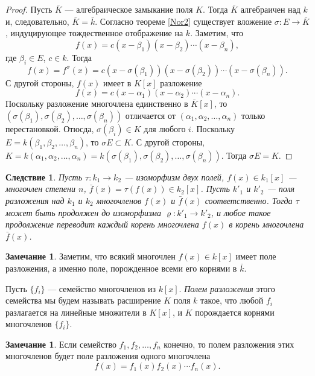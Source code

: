 \documentclass[12pt, titlepage, oneside]{amsbook}
\newtheorem{corollary}[theorem]{Следствие}
\theoremstyle{definition}
\newtheorem{remark}[theorem]{Замечание}
\theoremstyle{remark}
\begin{document}
\begin{proof}
Пусть $\bar{K}$ --- алгебраическое замыкание поля $K$. Тогда $\bar{K}$ алгебраичен над $k$ и, следовательно, $\bar{K}=\bar{k}$. Согласно теореме \ref{Nor2} существует вложение $\sigma\colon E\rightarrow\bar{K}$, индуцирующее тождественное отображение на $k$. Заметим, что $$f(x)=c(x-\beta_1)(x-\beta_2)\cdots (x-\beta_n),$$ где $\beta_i\in E$, $c\in k$. Тогда $$f(x)=f^{\sigma}(x)=c(x-\sigma(\beta_1))(x-\sigma(\beta_2))\cdots (x-\sigma(\beta_n)).$$ С другой стороны, $f(x)$ имеет в $K[x]$ разложение $$f(x)=c(x-\alpha_1)(x-\alpha_2)\cdots (x-\alpha_n).$$ Поскольку разложение многочлена единственно в $\bar{K}[x]$, то $(\sigma(\beta_1),\sigma(\beta_2),\ldots,\sigma(\beta_n))$ отличается от $(\alpha_1,\alpha_2,\ldots,\alpha_n)$ только перестановкой. Отюсда, $\sigma(\beta_i)\in K$ для любого $i$. Поскольку $E=k(\beta_1,\beta_2,\ldots,\beta_n)$, то $\sigma E\subset K$. С другой стороны, $K=k(\alpha_1,\alpha_2,\ldots,\alpha_n)=k(\sigma(\beta_1),\sigma(\beta_2),\ldots,\sigma(\beta_n))$. Тогда $\sigma E=K$.
\end{proof}

\begin{corollary}
\label{Nor3-1}
Пусть $\tau\colon k_1\rightarrow k_2$ --- изоморфизм двух полей, $f(x)\in k_1[x]$ --- многочлен степени $n$, $\bar{f}(x)=\tau(f(x))\in k_2[x]$. Пусть $k'_1$ и $k'_2$ --- поля разложения над $k_1$ и $k_2$ многочленов $f(x)$ и $\bar{f}(x)$ соответственно. Тогда $\tau$ может быть продолжен до изоморфизма $\varrho\colon k'_1\rightarrow k'_2$, и любое такое продолжение переводит каждый корень многочлена $f(x)$ в корень многочлена $\bar{f}(x)$.
\end{corollary}

\begin{remark}
Заметим, что всякий многочлен $f(x)\in k[x]$ имеет поле разложения, а именно поле, порожденное всеми его корнями в $\bar{k}$.
\end{remark}

Пусть $\{f_i\}$ --- семейство многочленов из $k[x]$. \emph{Полем разложения} этого семейства мы будем называть расширение $K$ поля $k$ такое, что любой $f_i$ разлагается на линейные множители в $K[x]$, и $K$ порождается корнями многочленов $\{f_i\}$.

\begin{remark}
Если семейство $f_1,f_2,\ldots, f_n$ конечно, то полем разложения этих многочленов будет поле разложения одного многочлена $$f(x)=f_1(x)f_2(x)\cdots f_n(x).$$
\end{remark}
\end{document}
